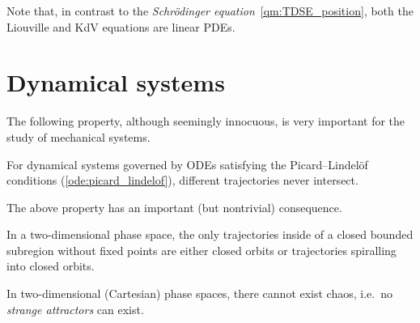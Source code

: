    \begin{remark}[Linearity]
        Note that, in contrast to the \textit{Schr\"odinger equation}~\eqref{qm:TDSE_position}, both the Liouville and KdV equations are linear PDEs.
    \end{remark}

\section{Dynamical systems}

    The following property, although seemingly innocuous, is very important for the study of mechanical systems.
    \begin{property}
        For dynamical systems governed by ODEs satisfying the Picard--Lindel\"of conditions (\cref{ode:picard_lindelof}), different trajectories never intersect.
    \end{property}

    The above property has an important (but nontrivial) consequence.
    \begin{theorem}
        In a two-dimensional phase space, the only trajectories inside of a closed bounded subregion without fixed points are either closed orbits or trajectories spiralling into closed orbits.
    \end{theorem}
    \begin{result}
        In two-dimensional (Cartesian) phase spaces, there cannot exist chaos, i.e.~no \textit{strange attractors} can exist.
    \end{result}



